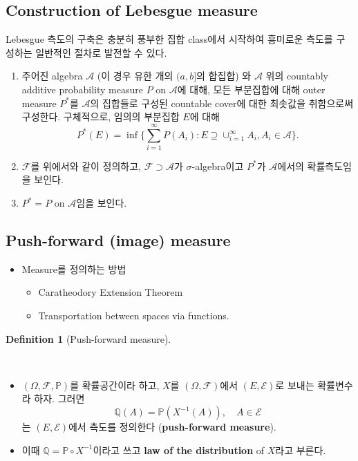 \documentclass[
  letterpaper,
  DIV=11,
  numbers=noendperiod]{scrreprt}
\providecommand{\tightlist}{%
  \setlength{\itemsep}{0pt}\setlength{\parskip}{0pt}}
\theoremstyle{definition}
\theoremstyle{plain}
\theoremstyle{plain}
\theoremstyle{definition}
\theoremstyle{plain}
\theoremstyle{definition}
\newtheorem{definition}{Definition}[chapter]
\theoremstyle{remark}
\begin{document}
\subsection{Construction of Lebesgue
measure}\label{construction-of-lebesgue-measure}

Lebesgue 측도의 구축은 충분히 풍부한 집합 class에서 시작하여 흥미로운
측도를 구성하는 일반적인 절차로 발전할 수 있다.

\begin{enumerate}
\def\labelenumi{\arabic{enumi}.}
\item
  주어진 algebra \(\mathcal{A}\) (이 경우 유한 개의 \((a,b]\)의 합집합)
  와 \(\mathcal{A}\) 위의 countably additive probability measure \(P\)
  on \(\mathcal{A}\)에 대해, 모든 부분집합에 대해 outer measure
  \(P^{*}\)를 \(\mathcal{A}\)의 집합들로 구성된 countable cover에 대한
  최솟값을 취함으로써 구성한다. 구체적으로, 임의의 부분집합 \(E\)에 대해
  \[
  P^{*}(E) = \inf \{\sum_{i=1}^{\infty} P(A_i): E \supseteq \cup_{i=1}^{\infty}A_i, A_i \in \mathcal{A} \}.
  \]
\item
  \(\mathcal{F}\)를 위에서와 같이 정의하고,
  \(\mathcal{F}\supset \mathcal{A}\)가 \(\sigma\)-algebra이고
  \(P^{*}\)가 \(\mathcal{A}\)에서의 확률측도임을 보인다.
\item
  \(P^{*}=P\) on \(\mathcal{A}\)임을 보인다.
\end{enumerate}

\subsection{Push-forward (image)
measure}\label{push-forward-image-measure}

\begin{itemize}
\tightlist
\item
  Measure를 정의하는 방법

  \begin{itemize}
  \tightlist
  \item
    Caratheodory Extension Theorem
  \item
    Transportation between spaces via functions.
  \end{itemize}
\end{itemize}

\begin{definition}[Push-forward
measure]\protect\hypertarget{def-pushforwardm}{}\label{def-pushforwardm}

~

\begin{itemize}
\item
  \((\Omega, \mathcal{F}, \mathbb{P})\)를 확률공간이라 하고, \(X\)를
  \((\Omega, \mathcal{F})\)에서 \((E, \mathcal{E})\)로 보내는 확률변수라
  하자. 그러면 \[
  \mathbb{Q}(A) = \mathbb{P}(X^{-1}(A)), \quad{} A\in \mathcal{E}
  \] 는 \((E,\mathcal{E})\)에서 측도를 정의한다 (\textbf{push-forward
  measure}).
\item
  이때 \(\mathbb{Q} = \mathbb{P}\circ X^{-1}\)이라고 쓰고 \textbf{law of
  the distribution} of \(X\)라고 부른다.
\end{itemize}

\end{definition}
\end{document}
